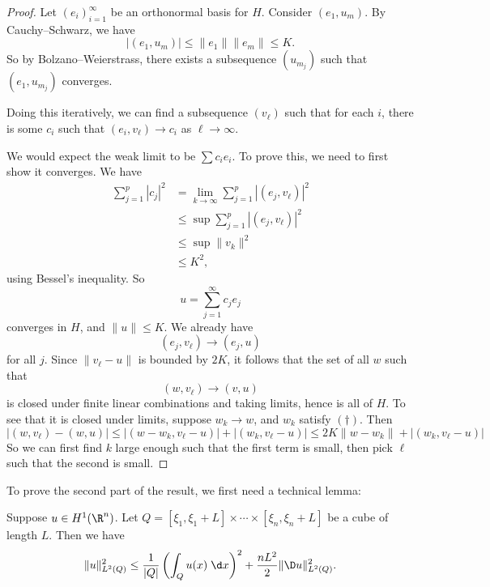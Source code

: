 \documentclass[a4paper]{article}
\begin{document}
\begin{proof}
  Let $(e_i)_{i = 1}^\infty$ be an orthonormal basis for $H$. Consider $(e_1, u_m)$. By Cauchy--Schwarz, we have
  \[
    |(e_1, u_m)| \leq \|e_1\| \|e_m\| \leq K.
  \]
  So by Bolzano--Weierstrass, there exists a subsequence $(u_{m_j})$ such that $(e_1, u_{m_j})$ converges.

  Doing this iteratively, we can find a subsequence $(v_\ell)$ such that for each $i$, there is some $c_i$ such that $(e_i, v_\ell) \to c_i$ as $\ell \to \infty$.

  We would expect the weak limit to be $\sum c_i e_i$. To prove this, we need to first show it converges. We have
  \begin{align*}
    \sum_{j = 1}^p |c_j|^2 &= \lim_{k \to \infty} \sum_{j = 1}^p |(e_j, v_\ell)|^2\\
    &\leq \sup \sum_{j = 1}^p |(e_j, v_\ell)|^2\\
    &\leq \sup \|v_k\|^2\\
    &\leq K^2,
  \end{align*}
  using Bessel's inequality. So
  \[
    u = \sum_{j = 1}^\infty c_j e_j
  \]
  converges in $H$, and $\|u\| \leq K$. We already have
  \[
    (e_j, v_{\ell}) \to (e_j, u)
  \]
  for all $j$. Since $\|v_\ell - u\|$ is bounded by $2K$, it follows that the set of all $w$ such that
  \[
    (w, v_\ell) \to (v, u)\tag{$\dagger$}
  \]
  is closed under finite linear combinations and taking limits, hence is all of $H$. To see that it is closed under limits, suppose $w_k \to w$, and $w_k$ satisfy $(\dagger)$. Then
  \[
    |(w, v_\ell) - (w, u)| \leq |(w - w_k, v_\ell - u)| + |(w_k, v_\ell - u)| \leq 2K \|w - w_k\| + |(w_k, v_\ell - u)|
  \]
  So we can first find $k$ large enough such that the first term is small, then pick $\ell$ such that the second is small.
\end{proof}

To prove the second part of the result, we first need a technical lemma:
\begin{lemma}
  Suppose $u \in H^1(\R^n)$. Let $Q = [\xi_1, \xi_1 + L] \times \cdots \times [\xi_n , \xi_n + L]$ be a cube of length $L$. Then we have
  \[
    \|u\|_{L^2(Q)}^2 \leq \frac{1}{|Q|} \left(\int_Q u(x) \;\d x\right)^2 + \frac{nL^2}{2} \|\D u\|_{L^2(Q)}^2.
  \]
\end{lemma}
\end{document}
